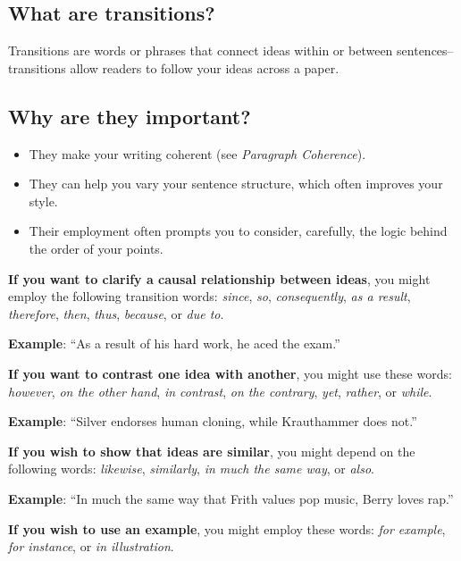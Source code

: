 \documentclass[12pt, hidelinks]{article} %
\newcommand{\tab}{\hspace*{2em}}
\begin{document}
\subsection {What are transitions?}

Transitions are words or phrases that connect ideas within or between sentences--transitions allow readers to follow your ideas across a paper.

\subsection{Why are they important?}

\begin{itemize}
\item They make your writing coherent (see \emph{Paragraph Coherence}). 

\item They can help you vary your sentence structure, which often improves your style.

\item Their employment often prompts you to consider, carefully, the logic behind the order of your points.

\end{itemize}
         

\textbf{If you want to clarify a causal relationship between ideas}, you might employ the following transition words: \emph{since}, \emph{so}, \emph{consequently}, \emph{as a result}, \emph{therefore}, \emph{then}, \emph{thus}, \emph{because}, or \emph{due to}.
 
 \tab \textbf{Example}: ``As a result of his hard work, he aced the exam.''

\textbf{If you want to contrast one idea with another}, you might use these words: \emph{however}, \emph{on the other hand}, \emph{in contrast}, \emph{on the contrary}, \emph{yet}, \emph{rather}, or \emph{while}.

\tab \textbf{Example}: ``Silver endorses human cloning, while Krauthammer does not.''

\textbf{If you wish to show that ideas are similar}, you might depend on the following words: \emph{likewise}, \emph{similarly}, \emph{in much the same way}, or \emph{also}.

\tab \textbf{Example}:  ``In much the same way that Frith values pop music, Berry loves rap.''      

\textbf{If you wish to use an example}, you might employ these words: \emph{for example}, \emph{for instance}, or \emph{in illustration}.
\end{document}
